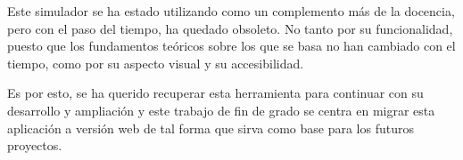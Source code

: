 \bigskip
Este simulador se ha estado utilizando como un complemento más de la docencia, pero
con el paso del tiempo, ha quedado obsoleto. No tanto por su funcionalidad, puesto
que los fundamentos teóricos sobre los que se basa no han cambiado con el tiempo, como 
por su aspecto visual y su accesibilidad.

\bigskip
Es por esto, se ha querido recuperar esta herramienta para continuar con su desarrollo 
y ampliación y este trabajo de fin de grado se centra en migrar esta aplicación a versión 
web de tal forma que sirva como base para los futuros proyectos.

